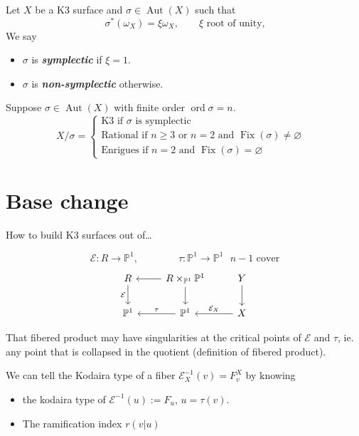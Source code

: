 \begin{defn}
Let $X$ be a K3 surface and $\sigma\in\operatorname{Aut}(X)$ such that
\[\sigma ^*(\omega_X)=\xi \omega_X,\qquad \xi \text{ root of unity,} \]
We say 
\begin{itemize}
\item $\sigma$ is \textit{\textbf{symplectic}} if $\xi =1$.
\item $\sigma$ is \textit{\textbf{non-symplectic}} otherwise.
\end{itemize}

Suppose $\sigma\in\operatorname{Aut}(X)$ with finite order $\operatorname{ord}\sigma=n$.
\[X/\sigma=\begin{cases}
	\text{K3 if $\sigma$ is symplectic}\\
	\text{Rational if $n\geq 3$ or $n=2$ and $\operatorname{Fix}(\sigma)\neq \varnothing $}\\
	\text{Enrigues if $n=2$ and $\operatorname{Fix}(\sigma)=\varnothing $} 
	\qquad &
\end{cases}\]
\end{defn}

\section{Base change}

How to build K3 surfaces out of…

\[\mathcal{E}:R\to \mathbb{P}^1,\qquad \qquad \tau :\mathbb{P}^1\to \mathbb{P}^1 \text{ $n-1$ cover} \]
\[\begin{tikzcd}
	R\arrow[d,"\mathcal{E}",swap]& R\times_{\mathbb{P}^1}\mathbb{P}^1\arrow[l]\arrow[d]& Y\arrow[d]\\
	\mathbb{P}^1&\mathbb{P}^1\arrow[l,"\tau ",swap]& X\arrow[l,swap,"\mathcal{E}_X"]
\end{tikzcd}\]

\begin{remark}[Sergey]\leavevmode
	That fibered product may have singularities at the critical points of $\mathcal{E}$ and $\tau$, ie. any point that is collapsed in the quotient (definition of fibered product).
\end{remark}

	We can tell the Kodaira type of a fiber $\mathcal{E}^{-1}_X(v)=F^X_v$ by knowing
	\begin{itemize}
	\item the kodaira type of $\mathcal{E}^{-1}(u):=F_u$, $u=\tau(v)$.
	\item The ramification index $r(v|u)$
	\end{itemize}

